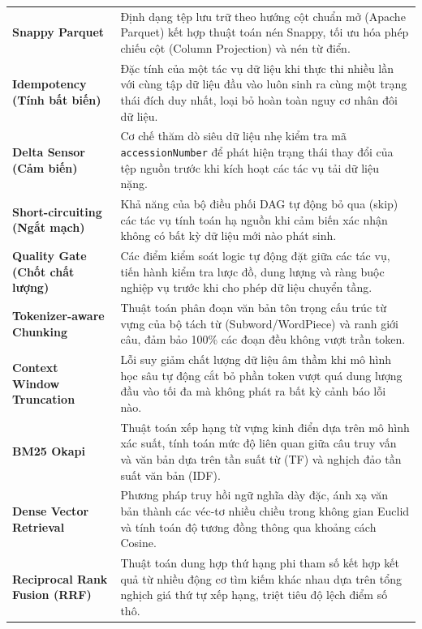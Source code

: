 \begin{table}[htbp]
\begin{tabularx}{\textwidth}{p{3.8cm} X}
\textbf{Snappy Parquet} & Định dạng tệp lưu trữ theo hướng cột chuẩn mở (Apache Parquet) kết hợp thuật toán nén Snappy, tối ưu hóa phép chiếu cột (Column Projection) và nén từ điển. \\
\textbf{Idempotency (Tính bất biến)} & Đặc tính của một tác vụ dữ liệu khi thực thi nhiều lần với cùng tập dữ liệu đầu vào luôn sinh ra cùng một trạng thái đích duy nhất, loại bỏ hoàn toàn nguy cơ nhân đôi dữ liệu. \\
\textbf{Delta Sensor (Cảm biến)} & Cơ chế thăm dò siêu dữ liệu nhẹ kiểm tra mã \texttt{accessionNumber} để phát hiện trạng thái thay đổi của tệp nguồn trước khi kích hoạt các tác vụ tải dữ liệu nặng. \\
\textbf{Short-circuiting (Ngắt mạch)} & Khả năng của bộ điều phối DAG tự động bỏ qua (skip) các tác vụ tính toán hạ nguồn khi cảm biến xác nhận không có bất kỳ dữ liệu mới nào phát sinh. \\
\textbf{Quality Gate (Chốt chất lượng)} & Các điểm kiểm soát logic tự động đặt giữa các tác vụ, tiến hành kiểm tra lược đồ, dung lượng và ràng buộc nghiệp vụ trước khi cho phép dữ liệu chuyển tầng. \\
\textbf{Tokenizer-aware Chunking} & Thuật toán phân đoạn văn bản tôn trọng cấu trúc từ vựng của bộ tách từ (Subword/WordPiece) và ranh giới câu, đảm bảo 100\% các đoạn đều không vượt trần token. \\
\textbf{Context Window Truncation} & Lỗi suy giảm chất lượng dữ liệu âm thầm khi mô hình học sâu tự động cắt bỏ phần token vượt quá dung lượng đầu vào tối đa mà không phát ra bất kỳ cảnh báo lỗi nào. \\
\textbf{BM25 Okapi} & Thuật toán xếp hạng từ vựng kinh điển dựa trên mô hình xác suất, tính toán mức độ liên quan giữa câu truy vấn và văn bản dựa trên tần suất từ (TF) và nghịch đảo tần suất văn bản (IDF). \\
\textbf{Dense Vector Retrieval} & Phương pháp truy hồi ngữ nghĩa dày đặc, ánh xạ văn bản thành các véc-tơ nhiều chiều trong không gian Euclid và tính toán độ tương đồng thông qua khoảng cách Cosine. \\
\textbf{Reciprocal Rank Fusion (RRF)} & Thuật toán dung hợp thứ hạng phi tham số kết hợp kết quả từ nhiều động cơ tìm kiếm khác nhau dựa trên tổng nghịch giá thứ tự xếp hạng, triệt tiêu độ lệch điểm số thô. \\
\bottomrule
\end{tabularx}
\end{table}
